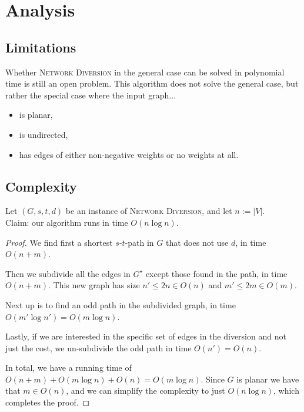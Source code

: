 \section{Analysis}

\subsection{Limitations}
Whether \textsc{Network Diversion} in the general case can be solved in polynomial time is still an open problem.
This algorithm does not solve the general case, but rather the special case where the input graph...
\begin{itemize}
    \item is planar,
    \item is undirected,
    \item has edges of either non-negative weights or no weights at all.
\end{itemize}


\subsection{Complexity}
Let $(G, s, t, d)$ be an instance of \textsc{Network Diversion}, and let $n := |V|$. \\
Claim: our algorithm runs in time $O(n \log n)$.

\begin{proof}
    We find first a shortest $s$-$t$-path in $G$ that does not use $d$, in time $O(n+m)$.

    Then we subdivide all the edges in $G^\star$ except those found in the path, in time $O(n+m)$. This new graph has size $n' \leq 2n \in O(n)$ and $m' \leq 2m \in O(m)$.

    Next up is to find an odd path in the subdivided graph, in time $O(m' \log n') = O(m \log n)$.

    Lastly, if we are interested in the specific set of edges in the diversion and not just the cost, we un-subdivide the odd path in time $O(n') = O(n)$.

    In total, we have a running time of $O(n+m) + O(m \log n) + O(n) = O(m \log n)$. Since $G$ is planar we have that $m \in O(n)$, and we can simplify the complexity to just $O(n \log n)$, which completes the proof.
\end{proof}

